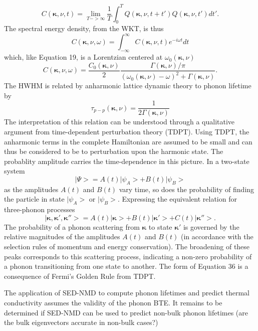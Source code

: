 \documentclass[aps,prb,preprint,preprintnumbers,amsmath,amssymb,floatfix,superscriptaddress]{revtex4}
\begin{document}
\begin{equation}
C(\pmb{\kappa},\nu,t)=\lim_{T->\infty}\frac{1}{T}\int_{0}^{T}Q(\pmb{\kappa},\nu,t+t')Q(\pmb{\kappa},\nu,t')dt'.
\end{equation}
The spectral energy density, from the WKT, is thus
\begin{equation}
C(\pmb{\kappa},\nu,\omega)=\int_{-\infty}^{\infty}C(\pmb{\kappa},\nu,t)e^{-i\omega t}dt
\end{equation}
which, like Equation 19, is a Lorentzian centered at $\omega_0(\pmb{\kappa},\nu)$
\begin{equation}
C(\pmb{\kappa},\nu,\omega)=\frac{C_0(\pmb{\kappa},\nu)}{2}\frac{\Gamma(\pmb{\kappa},\nu)/\pi}{(\omega_0(\pmb{\kappa},\nu)-\omega)^2+\Gamma(\pmb{\kappa},\nu)}.
\end{equation}
The HWHM is related by anharmonic lattice dynamic theory \cite{PhysRev.128.2589} to phonon lifetime by
\begin{equation}
\tau_{p-p}(\pmb{\kappa}, \nu)=\frac{1}{2\Gamma(\pmb{\kappa},\nu)}
\end{equation}
The interpretation of this relation can be understood through a qualitative argument from time-dependent perturbation theory (TDPT). Using TDPT, the anharmonic terms in the complete Hamiltonian are assumed to be small and can thus be considered to be to perturbation upon the harmonic state. The probablity amplitude carries the time-dependence in this picture. In a two-state system
\begin{equation}
|\Psi>=A(t)|\psi_A>+B(t)|\psi_B>
\end{equation}
as the amplitudes $A(t)$ and $B(t)$ vary time, so does the probability of finding the particle in state $|\psi_A>$ or $|\psi_B>$. Expressing the equivalent relation for three-phonon processes
\begin{equation}
|\pmb{\kappa},\pmb{\kappa}',\pmb{\kappa}''>=A(t)|\pmb{\kappa}>+B(t)|\pmb{\kappa}'>+C(t)|\pmb{\kappa}''>.
\end{equation}
The probability of a phonon scattering from $\pmb{\kappa}$ to state $\pmb{\kappa}'$ is governed by the relative magnitudes of the amplitudes $A(t)$ and $B(t)$ (in accordance with the selection rules of momentum and energy conservation). The broadening of these peaks corresponds to this scattering process, indicating a non-zero probability of a phonon transitioning from one state to another. The form of Equation 36 is a consequence of Fermi's Golden Rule from TDPT.

The application of SED-NMD to compute phonon lifetimes and predict thermal conductivity assumes the validity of the phonon BTE. It remains to be determined if SED-NMD can be used to predict non-bulk phonon lifetimes (are the bulk eigenvectors accurate in non-bulk cases?) 
\end{document}
